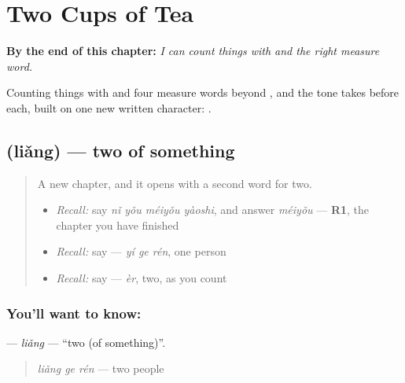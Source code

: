 
\chapter{Two Cups of Tea}
\label{ch:zh-two-cups-of-tea}

\begin{chapteropening}
\textbf{By the end of this chapter:} \emph{I can count things with  and the right measure word.}

Counting things with  and four measure words beyond , and the tone  takes before each, built on one new written character: .
\end{chapteropening}

\section[\texorpdfstring{\zh{两} (liǎng)}{两 (liǎng)}]{ (liǎng) — two of something}

\label{lesson:ZH-C88-liang}



\begin{quote}
A new chapter, and it opens with a second word for two.

\begin{itemize}
\raggedright
  \item \emph{Recall:} say \emph{nǐ yǒu méiyǒu yàoshi}, and answer \emph{méiyǒu} — \textbf{R1}, the chapter you have finished
  \item \emph{Recall:} say  — \emph{yí ge rén}, one person
  \item \emph{Recall:} say  — \emph{èr}, two, as you count
\end{itemize}
\end{quote}

\subsection*{You'll want to know: }
\textbf{} — \emph{liǎng} — \textquotedblleft{}two (of something)\textquotedblright{}.

\begin{quote}
\textbf{} \emph{liǎng ge rén} — two people
\end{quote}

